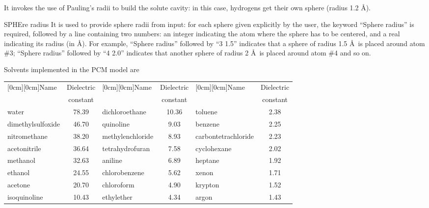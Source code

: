 \begin{keywordlist}
It invokes the use of Pauling's radii to build the solute cavity: in
this case, hydrogens get their own sphere (radius 1.2 \AA).
\item[SPHEre radius]
It is used to provide sphere radii from input: for each sphere given
explicitly by the user, the keyword ``Sphere radius'' is required,
followed by a line containing two numbers: an integer indicating the
atom where the sphere has to be centered, and a real indicating its
radius (in \AA). For example, ``Sphere radius'' followed by ``3 1.5''
indicates that a sphere of radius 1.5 \AA\ is placed around atom \#3;
``Sphere radius'' followed by ``4 2.0'' indicates that another sphere of
radius 2 \AA\ is placed around atom \#4 and so on.

\end{keywordlist}

Solvents implemented in the PCM model are

%
\begin{tabular}{| l @{} c | l @{} c | l @{} c |}
\hline
\hline
\raisebox{-1.2ex}[0cm][0cm]{Name} & Dielectric  &
\raisebox{-1.2ex}[0cm][0cm]{Name} & Dielectric  &
\raisebox{-1.2ex}[0cm][0cm]{Name} & Dielectric \\
                                  & constant  & & constant & & constant \\
\hline
water             & 78.39 & dichloroethane     &10.36 & toluene            & 2.38 \\[0.2cm]
dimethylsulfoxide & 46.70 & quinoline          & 9.03 & benzene            & 2.25 \\[0.2cm]
nitromethane      & 38.20 & methylenchloride   & 8.93 & carbontetrachloride& 2.23 \\[0.2cm]
acetonitrile      & 36.64 & tetrahydrofuran    & 7.58 & cyclohexane        & 2.02 \\[0.2cm]
methanol          & 32.63 & aniline            & 6.89 & heptane            & 1.92 \\[0.2cm]
ethanol           & 24.55 & chlorobenzene      & 5.62 & xenon              & 1.71 \\[0.2cm]
acetone           & 20.70 & chloroform         & 4.90 & krypton            & 1.52 \\[0.2cm]
isoquinoline      & 10.43 & ethylether         & 4.34 & argon              & 1.43 \\[0.2cm]
\hline
\hline
\end{tabular}



